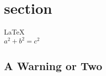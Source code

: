 \documentclass{article}
\begin{document}
               
 
 
\section{section}          
\LaTeX \,\\ 
 $a^2+b^2=c^2$

\subsection{A Warning or Two}  

\end{document}
